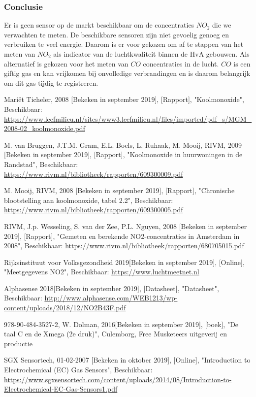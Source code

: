 \documentclass[a4paper, 11pt]{article} %
\begin{document}
	\subsubsection{Conclusie}
	Er is geen sensor op de markt beschikbaar om de concentraties $NO_2$ die we verwachten te meten. De beschikbare sensoren zijn niet gevoelig genoeg en verbruiken te veel energie. Daarom is er voor gekozen om af te stappen van het meten van $NO_2$ als indicator van de luchtkwaliteit binnen de HvA gebouwen. Als alternatief is gekozen voor het meten van $CO$ concentraties in de lucht. $CO$ is een giftig gas en kan vrijkomen bij onvolledige verbrandingen en is daarom belangrijk om dit gas tijdig te registreren.
	\newpage
	\begin{thebibliography}{9}
		Mariët Ticheler, 
		2008 [Bekeken in september 2019],
		[Rapport],
		"Koolmonoxide",
		Beschikbaar: \url{https://www.leefmilieu.nl/sites/www3.leefmilieu.nl/files/imported/pdf_s/MGM_2008-02_koolmonoxide.pdf}
		
		M. van Bruggen, J.T.M. Gram, E.L. Boels, L. Ruhaak, M. Mooij,
		RIVM,
		2009 [Bekeken in september 2019],
		[Rapport],
		"Koolmonoxide in huurwoningen in de Randstad",
		Beschikbaar: \url{https://www.rivm.nl/bibliotheek/rapporten/609300009.pdf}
		
		M. Mooij,
		RIVM,
		2008 [Bekeken in september 2019],
		[Rapport],
		"Chronische blootstelling aan koolmonoxide, tabel 2.2",
		Beschikbaar: \url{https://www.rivm.nl/bibliotheek/rapporten/609300005.pdf}
		
		RIVM, J.p. Wesseling, S. van der Zee, P.L. Nguyen,
		2008 [Bekeken in september 2019],
		[Rapport],
		"Gemeten en berekende NO2-concentraties in Amsterdam in 2008",
		Beschikbaar: \url{https://www.rivm.nl/bibliotheek/rapporten/680705015.pdf}
		
		Rijksinstituut voor Volksgezondheid
		2019[Bekeken in september 2019],
		[Online],
		"Meetgegevens NO2",
		Beschikbaar: \url{https://www.luchtmeetnet.nl}
		
		Alphasense
		2018[Bekeken in september 2019],
		[Datasheet],
		"Datasheet",
		Beschikbaar: \url{http://www.alphasense.com/WEB1213/wp-content/uploads/2018/12/NO2B43F.pdf}
		
		978-90-484-3527-2,
		W. Dolman,
		2016[Bekeken in september 2019],
		[boek],
		"De taal C en de Xmega (2e druk)",
		Culemborg,
		Free Musketeers uitgeverij en productie
		
		SGX Sensortech,
		01-02-2007 [Bekeken in oktober 2019],
		[Online],
		"Introduction to Electrochemical (EC) Gas Sensors",
		Beschikbaar: \url{https://www.sgxsensortech.com/content/uploads/2014/08/Introduction-to-Electrochemical-EC-Gas-Sensors1.pdf}
		
	\end{thebibliography}
\end{document}
